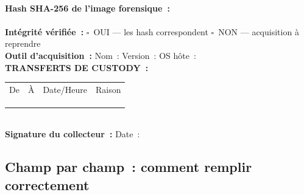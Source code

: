 \begin{boxcustody}
\texttt{\underline{\hspace{10cm}}}\\[0.3ex]
\textbf{Hash SHA-256 de l'image forensique~:}\\
\texttt{\underline{\hspace{10cm}}}\\[0.5ex]
\textbf{Intégrité vérifiée~:}
$\square$~OUI --- les hash correspondent
\quad $\square$~NON --- acquisition à reprendre\\[0.5ex]
\textbf{Outil d'acquisition~:} Nom~: \underline{\hspace{3cm}}
Version~: \underline{\hspace{2cm}}
OS hôte~: \underline{\hspace{2.5cm}}\\[0.8ex]
\textbf{TRANSFERTS DE CUSTODY~:}\\[0.3ex]
\begin{tabular}{p{2.8cm}p{2.8cm}p{2.0cm}p{3.5cm}}
De & À & Date/Heure & Raison \\
\underline{\hspace{2.6cm}} & \underline{\hspace{2.6cm}} &
\underline{\hspace{1.8cm}} & \underline{\hspace{3.3cm}} \\[0.4ex]
\underline{\hspace{2.6cm}} & \underline{\hspace{2.6cm}} &
\underline{\hspace{1.8cm}} & \underline{\hspace{3.3cm}} \\[0.4ex]
\underline{\hspace{2.6cm}} & \underline{\hspace{2.6cm}} &
\underline{\hspace{1.8cm}} & \underline{\hspace{3.3cm}} \\
\end{tabular}
\\[0.8ex]
\textbf{Signature du collecteur~:} \underline{\hspace{5cm}}
\quad Date~: \underline{\hspace{2.5cm}}
\end{boxcustody}

\subsection{Champ par champ~: comment remplir correctement}

